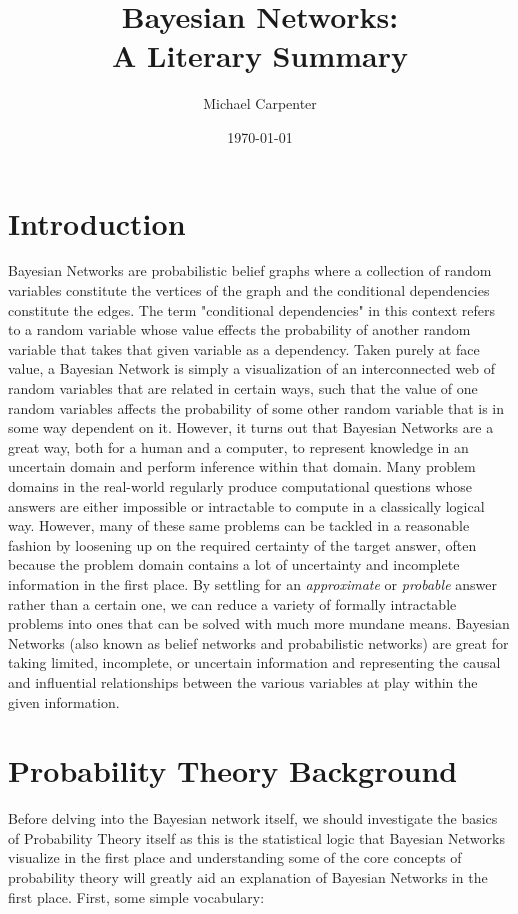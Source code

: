 \documentclass[a4paper,12pt]{article}
\title{Bayesian Networks: \\ A Literary Summary}
\author{Michael Carpenter}
\date{\today}
\begin{document}
\maketitle
{}

\section{Introduction}

Bayesian Networks are probabilistic belief graphs where a collection of random variables constitute the vertices of the graph and the conditional dependencies constitute the edges\cite{wiki:Bayesian_network}. The term "conditional dependencies" in this context refers to a random variable whose value effects the probability of another random variable that takes that given variable as a dependency. Taken purely at face value, a Bayesian Network is simply a visualization of an interconnected web of random variables that are
related in certain ways, such that the value of one random variables affects the probability of some other random variable that is in some way dependent on it. However, it turns out that Bayesian Networks are a great way, both for a human and a computer, to represent knowledge in an uncertain domain and perform inference within that domain. Many problem domains in the real-world regularly produce computational questions whose answers are either impossible or intractable to compute in a
classically logical way. However, many of these same problems can be tackled in a reasonable fashion by loosening up on the required certainty of the target answer, often because the problem domain contains a lot of uncertainty and incomplete information in the first place. By settling for an \emph{approximate} or \emph{probable} answer rather than a certain one, we can reduce a variety of formally intractable problems into ones that can be solved with much more mundane means. Bayesian Networks
(also known as belief networks and probabilistic networks) are great for taking limited, incomplete, or uncertain information and representing the causal and influential relationships between the various variables at play within the given information. 

\section{Probability Theory Background}

Before delving into the Bayesian network itself, we should investigate the basics of Probability Theory itself as this is the statistical logic that Bayesian Networks visualize in the first place and understanding some of the core concepts of probability theory will greatly aid an explanation of Bayesian Networks in the first place. First, some simple vocabulary\cite{Russell2003}:
\end{document}
